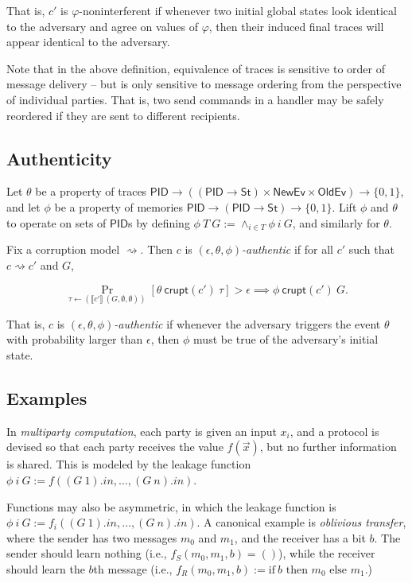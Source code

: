 \documentclass{article}
\newcommand{\St}{\mathsf{St}}
\newcommand{\PID}{\mathsf{PID}}
\newcommand{\NewEv}{\mathsf{NewEv}}
\newcommand{\OldEv}{\mathsf{OldEv}}
\begin{document}
That is, $c'$ is $\varphi$-noninterferent  if whenever two initial global states look identical to the adversary and agree on values of $\varphi$, then their induced final traces will appear identical to the adversary. 

Note that in the above definition, equivalence of traces is sensitive to order of message delivery -- but is only sensitive to message ordering from the perspective of individual parties. That is, two send commands in a handler may be safely reordered if they are sent to different recipients.


\subsection{Authenticity}

Let $\theta$ be a property of traces $\PID \to ((\PID \to \St) \times \NewEv \times \OldEv) \to \{0,1\}$, and let $\phi$ be a property of memories $\PID \to (\PID \to \St) \to \{0,1\}$. Lift $\phi$ and $\theta$ to operate on sets of $\PID$s by defining $\phi\ T\ G := \wedge_{i \in T} \phi\ i\ G$, and similarly for $\theta$.

Fix a corruption model $\rightsquigarrow$. Then $c$ is \emph{$(\epsilon, \theta, \phi)$-authentic} if for all $c'$ such that $c \rightsquigarrow c'$ and $G$,

\[ \Pr_{\tau \leftarrow (\llbracket c' \rrbracket\ (G, \emptyset, \emptyset))}[\theta\ \mathsf{crupt}(c')\ \tau] > \epsilon \implies \phi\ \mathsf{crupt}(c')\ G.\]

That is, $c$ is \emph{$(\epsilon, \theta, \phi)$-authentic} if whenever the adversary triggers the event $\theta$ with probability larger than $\epsilon$, then $\phi$ must be true of the adversary's initial state.


\subsection{Examples}


In \emph{multiparty computation}, each party is given an input $x_i$, and a protocol is devised so that each party receives the value $f(\vec{x})$, but no further information is shared. This is modeled by the leakage function $\phi\ i\ G := f((G\ 1).in, \dots, (G\ n).in)$.

Functions may also be asymmetric, in which the leakage function is $\phi\ i\ G := f_i((G\ 1).in, \dots, (G\ n).in)$. A canonical example is \emph{oblivious transfer}, where the sender has two messages $m_0$ and $m_1$, and the receiver has a bit $b$. The sender should learn nothing (i.e., $f_S (m_0, m_1, b) = ()$), while the receiver should learn the $b$th message (i.e., $f_R (m_0, m_1, b) := \text{if}\ b \text{ then } m_0 \text{ else } m_1.$)
\end{document}
